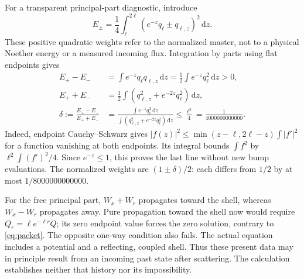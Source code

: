 \documentclass[11pt]{article}
\newcommand{\dd}{\,\mathrm d}
\begin{document}
For a transparent principal-part diagnostic, introduce
\begin{equation}
 E_\pm=\frac14\int_\ell^{2\ell}(e^{-z}q_\ell\pm q_{\ell,z})^2\dd z.
 \label{eq:weights}
\end{equation}
These positive quadratic weights refer to the normalized master, not to a
physical Noether energy or a measured incoming flux. Integration by parts
using flat endpoints gives
\begin{equation}
\begin{aligned}
 E_+-E_-&=\int e^{-z}q_\ell q_{\ell,z}\dd z
          =\frac12\int e^{-z}q_\ell^2\dd z>0,\\
 E_++E_-&=\frac12\int(q_{\ell,z}^2+e^{-2z}q_\ell^2)\dd z,\\
 \delta:=\frac{E_+-E_-}{E_++E_-}
 &=\frac{\int e^{-z}q_\ell^2\dd z}
         {\int(q_{\ell,z}^2+e^{-2z}q_\ell^2)\dd z}
 \le\frac{\ell^2}{4}=\frac1{4000000000000}.
\end{aligned}
\label{eq:imbalance}
\end{equation}
Indeed, endpoint Cauchy--Schwarz gives
$|f(z)|^2\le\min(z-\ell,2\ell-z)\int|f'|^2$ for a function
vanishing at both endpoints. Its integral bounds $\int f^2$ by
$\ell^2\int(f')^2/4$. Since $e^{-z}\le1$, this proves the last line without
new bump evaluations. The normalized weights are $(1\pm\delta)/2$:
each differs from $1/2$ by at most $1/8000000000000$.

For the free principal part, $W_x+W_r$ propagates toward the shell,
whereas $W_x-W_r$ propagates away. Pure propagation toward the shell now
would require $Q_r=\ell e^{-\ell r}Q$; its zero endpoint value forces the
zero solution, contrary to \eqref{eq:packet}. The opposite one-way condition
also fails. The actual equation includes a potential and a reflecting,
coupled shell. Thus these present data may in principle result from an
incoming past state after scattering. The calculation establishes neither
that history nor its impossibility.
\end{document}

